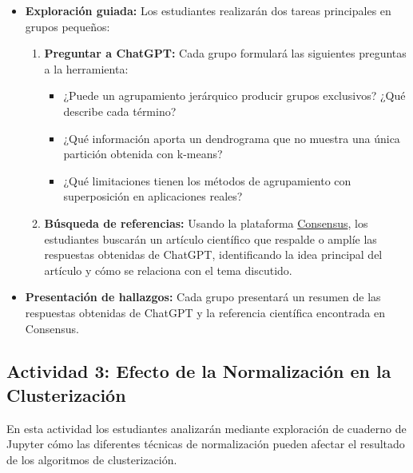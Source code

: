 \documentclass[a4,11pt]{aleph-notas}
\begin{document}
\begin{itemize}[leftmargin=*]
    \item \textbf{Exploración guiada:}  
    Los estudiantes realizarán dos tareas principales en grupos pequeños:
    \begin{enumerate}
        \item \textbf{Preguntar a ChatGPT:} Cada grupo formulará las siguientes preguntas a la herramienta:
        \begin{itemize}
            \item ¿Puede un agrupamiento jerárquico producir grupos exclusivos? ¿Qué describe cada término?
            \item ¿Qué información aporta un dendrograma que no muestra una única partición obtenida con k-means?
            \item ¿Qué limitaciones tienen los métodos de agrupamiento con superposición en aplicaciones reales?
        \end{itemize}
        \item \textbf{Búsqueda de referencias:} Usando la plataforma \href{https://consensus.app/}{Consensus}, los estudiantes buscarán un artículo científico que respalde o amplíe las respuestas obtenidas de ChatGPT, identificando la idea principal del artículo y cómo se relaciona con el tema discutido.
    \end{enumerate}
    
    \item \textbf{Presentación de hallazgos:}
    Cada grupo presentará un resumen de las respuestas obtenidas de ChatGPT y la referencia científica encontrada en Consensus.
    
\end{itemize}

\subsection*{Actividad 3: Efecto de la Normalización en la Clusterización}

En esta actividad los estudiantes analizarán mediante exploración de cuaderno de Jupyter cómo las diferentes técnicas de normalización pueden afectar el resultado de los algoritmos de clusterización.
\end{document}
